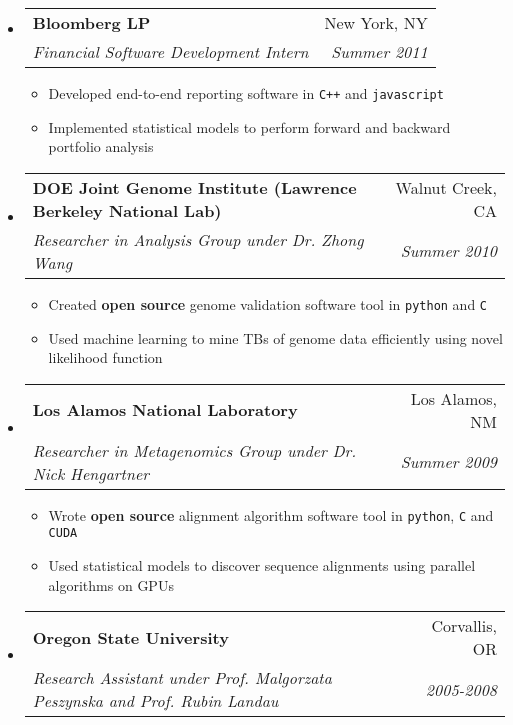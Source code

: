 \documentclass[letterpaper,1opt]{article}
\makeatletter
\newcommand{\resitem}[1]{\item #1 \vspace{-2pt}}
\newcommand{\ressubheading}[4]{
\begin{tabular*}{6.5in}{l@{\cftdotfill{\cftsecdotsep}\extracolsep{\fill}}r}
		\textbf{#1} & #2 \\
		\textit{#3} & \textit{#4} \\
\end{tabular*}\vspace{-6pt}}
\makeatother
\begin{document}
		\begin{itemize}

		\item

			\ressubheading{Bloomberg LP}{New York, NY}{Financial Software Development Intern}{Summer 2011}

			\begin{itemize}

				\resitem{Developed end-to-end reporting software in \texttt{C++} and \texttt{javascript}}

		    \resitem{Implemented statistical models to perform forward and backward portfolio analysis}

			\end{itemize}

		\item

			\ressubheading{DOE Joint Genome Institute (Lawrence Berkeley National Lab)}{Walnut Creek, CA}{Researcher in Analysis Group under Dr. Zhong Wang}{Summer 2010}

			\begin{itemize}

				\resitem{Created \textbf{open source} genome validation software tool in \texttt{python} and \texttt{C}}

		    \resitem{Used machine learning to mine TBs of genome data efficiently using novel likelihood function}

			\end{itemize}

		\item 

			\ressubheading{Los Alamos National Laboratory}{Los Alamos, NM}{Researcher in Metagenomics Group under Dr. Nick Hengartner}{Summer 2009}

			\begin{itemize}

				\resitem{Wrote \textbf{open source} alignment algorithm software tool in \texttt{python}, \texttt{C} and \texttt{CUDA}}

		    \resitem{Used statistical models to discover sequence alignments using parallel algorithms on GPUs}

			\end{itemize}

		\item

			\ressubheading{Oregon State University}{Corvallis, OR}{Research Assistant under Prof. Malgorzata Peszynska and Prof. Rubin Landau}{2005-2008}


\end{itemize}
\end{document}

